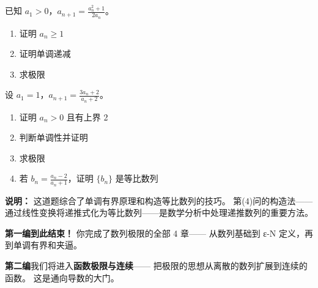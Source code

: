 \begin{exercise}[6]
已知 \(a_1 > 0\)，\(a_{n+1} = \frac{a_n^2 + 1}{2a_n}\)。
\begin{enumerate}
  \item[(1)] 证明 \(a_n \ge 1\)
  \item[(2)] 证明单调递减
  \item[(3)] 求极限
\end{enumerate}
\end{exercise}


\begin{exercise}[7]
设 \(a_1 = 1\)，\(a_{n+1} = \frac{3a_n + 2}{a_n + 2}\)。
\begin{enumerate}
  \item[(1)] 证明 \(a_n > 0\) 且有上界 2
  \item[(2)] 判断单调性并证明
  \item[(3)] 求极限
  \item[(4)] 若 \(b_n = \frac{a_n - 2}{a_n + 1}\)，证明 \(\{b_n\}\) 是等比数列
\end{enumerate}

\textbf{说明：} 这道题综合了单调有界原理和构造等比数列的技巧。
第(4)问的构造法——通过线性变换将递推式化为等比数列——是数学分析中处理递推数列的重要方法。
\end{exercise}



\textbf{第一编到此结束！} 你完成了数列极限的全部 4 章——
从数列基础到 ε-N 定义，再到单调有界和夹逼。

\textbf{第二编}我们将进入\textbf{函数极限与连续}——
把极限的思想从离散的数列扩展到连续的函数。
这是通向导数的大门。
